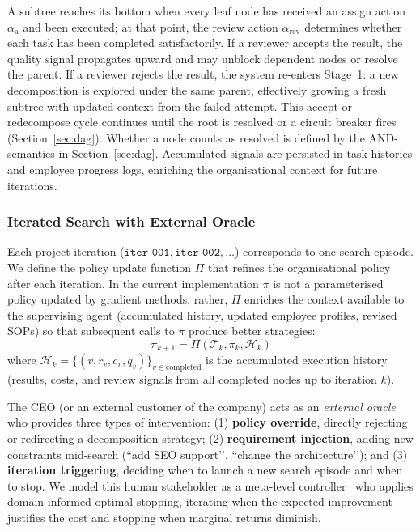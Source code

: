 \documentclass[11pt,a4paper]{article}
\begin{document}
A subtree reaches its bottom when every leaf node has received an assign action $\alpha_{\text{a}}$ and been executed; at that point, the review action $\alpha_{\text{rev}}$ determines whether each task has been completed satisfactorily.  If a reviewer accepts the result, the quality signal propagates upward and may unblock dependent nodes or resolve the parent.  If a reviewer rejects the result, the system re-enters Stage~1: a new decomposition is explored under the same parent, effectively growing a fresh subtree with updated context from the failed attempt.  This accept-or-redecompose cycle continues until the root is resolved or a circuit breaker fires (Section~\ref{sec:dag}).  Whether a node counts as resolved is defined by the AND-semantics in Section~\ref{sec:dag}.  Accumulated signals are persisted in task histories and employee progress logs, enriching the organisational context for future iterations.

\subsubsection{Iterated Search with External Oracle}

Each project iteration ($\texttt{iter\_001}, \texttt{iter\_002}, \ldots$) corresponds to one search episode.  We define the policy update function $\Pi$ that refines the organisational policy after each iteration.  In the current implementation $\pi$ is not a parameterised policy updated by gradient methods; rather, $\Pi$ enriches the context available to the supervising agent (accumulated history, updated employee profiles, revised SOPs) so that subsequent calls to $\pi$ produce better strategies:
\begin{equation}
\pi_{k+1} = \Pi(\mathcal{T}_k, \pi_k, \mathcal{H}_k)
\end{equation}
where $\mathcal{H}_k = \{(v, r_v, c_v, q_v)\}_{v \in \text{completed}}$ is the accumulated execution history (results, costs, and review signals from all completed nodes up to iteration $k$).

The CEO (or an external customer of the company) acts as an \emph{external oracle} who provides three types of intervention: (1) \textbf{policy override}, directly rejecting or redirecting a decomposition strategy; (2) \textbf{requirement injection}, adding new constraints mid-search (``add SEO support’’, ``change the architecture’’); and (3) \textbf{iteration triggering}, deciding when to launch a new search episode and when to stop. We model this human stakeholder as a meta-level controller~\cite{russell1991right} who applies domain-informed optimal stopping, iterating when the expected improvement justifies the cost and stopping when marginal returns diminish.
\end{document}

